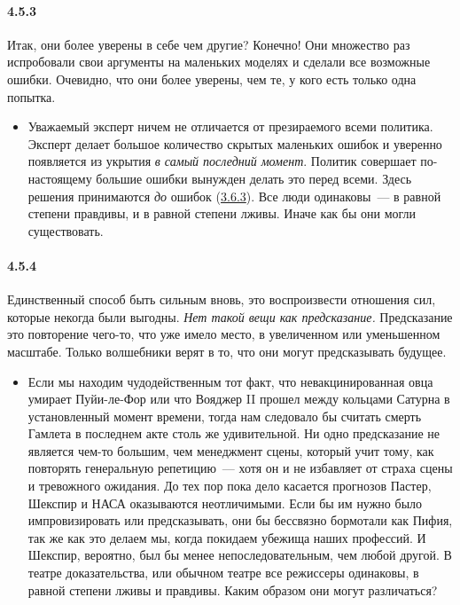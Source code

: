 \paragraph{4.5.3}\hypertarget{par:4.5.3}{} Итак, они более уверены в себе чем другие? Конечно! Они множество раз испробовали свои аргументы на маленьких моделях и сделали все возможные ошибки. Очевидно, что они более уверены, чем те, у кого есть только одна попытка.
	\begin{itemize}
	\item 
	Уважаемый эксперт ничем не отличается от презираемого всеми политика. Эксперт делает большое количество скрытых маленьких ошибок и уверенно появляется из укрытия {\itshape в самый последний момент}. Политик совершает по-настоящему большие ошибки вынужден делать это перед всеми. Здесь решения принимаются {\itshape до} ошибок (\hyperlink{par:3.6.3}{3.6.3}). Все люди одинаковы~--- в равной степени правдивы, и в равной степени лживы. Иначе как бы они могли существовать.
	\end{itemize}	 

\paragraph{4.5.4}\hypertarget{par:4.5.4}{} Единственный способ быть сильным вновь, это воспроизвести отношения сил, которые некогда были выгодны. {\itshape Нет такой вещи как предсказание.} Предсказание это повторение чего-то, что уже имело место, в увеличенном или уменьшенном масштабе. Только волшебники верят в то, что они могут предсказывать будущее. 
	\begin{itemize}
	\item 
	Если мы находим чудодейственным тот факт, что невакцинированная овца умирает Пуйи-ле-Фор или что Вояджер II прошел между кольцами Сатурна в установленный момент времени, тогда нам следовало бы считать смерть Гамлета в последнем акте столь же удивительной. Ни одно предсказание не является чем-то большим, чем менеджмент сцены, который учит тому, как повторять генеральную репетицию~--- хотя он и не избавляет от страха сцены и тревожного ожидания. До тех пор пока дело касается прогнозов Пастер, Шекспир и НАСА оказываются неотличимыми. Если бы им нужно было импровизировать или предсказывать, они бы бессвязно бормотали как Пифия, так же как это делаем мы, когда покидаем убежища наших профессий. И Шекспир, вероятно, был бы менее непоследовательным, чем любой другой. В театре доказательства, или обычном театре все режиссеры одинаковы, в равной степени лживы и правдивы. Каким образом они могут различаться?
	\end{itemize}	

